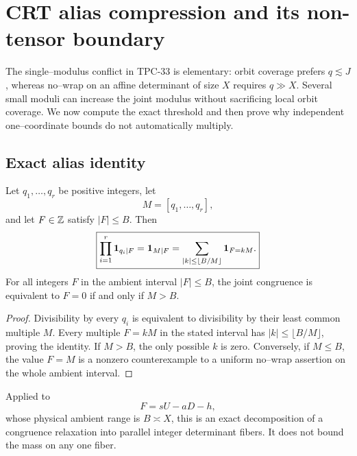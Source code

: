 \section{CRT alias compression and its non-tensor boundary}
\label{sec:tpc35-crt-alias}

The single--modulus conflict in TPC-33 is elementary: orbit coverage
prefers \(q\lesssim J\), whereas no--wrap on an affine determinant of
size \(X\) requires \(q\gg X\).  Several small moduli can increase the
joint modulus without sacrificing local orbit coverage.  We now compute
the exact threshold and then prove why independent one--coordinate bounds
do not automatically multiply.

\subsection{Exact alias identity}

\begin{theorem}
\label{thm:tpc35-alias-decomposition}
Let \(q_1,\ldots,q_r\) be positive integers, let
\begin{equation}
 M=[q_1,\ldots,q_r],
 \label{eq:tpc35-joint-modulus}
\end{equation}
and let \(F\in\mathbb Z\) satisfy \(|F|\le B\).  Then
\begin{equation}
 \boxed{
 \prod_{i=1}^r\mathbf 1_{q_i\mid F}
 =\mathbf 1_{M\mid F}
 =\sum_{|k|\le\lfloor B/M\rfloor}\mathbf 1_{F=kM}.}
 \label{eq:tpc35-alias-identity}
\end{equation}
For all integers \(F\) in the ambient interval \(|F|\le B\), the joint
congruence is equivalent to \(F=0\) if and only if \(M>B\).
\end{theorem}

\begin{proof}
Divisibility by every \(q_i\) is equivalent to divisibility by their least
common multiple \(M\).  Every multiple \(F=kM\) in the stated interval
has \(|k|\le\lfloor B/M\rfloor\), proving the identity.  If \(M>B\), the
only possible \(k\) is zero.  Conversely, if \(M\le B\), the value \(F=M\)
is a nonzero counterexample to a uniform no--wrap assertion on the whole
ambient interval.
\end{proof}

Applied to
\begin{equation}
 F=sU-aD-h,
 \label{eq:tpc35-affine-determinant}
\end{equation}
whose physical ambient range is \(B\asymp X\), this is an exact
decomposition of a congruence relaxation into parallel integer determinant
fibers.  It does not bound the mass on any one fiber.

